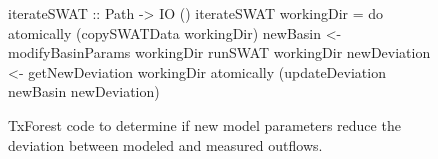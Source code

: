 \begin{figure}
\begin{code}
iterateSWAT :: Path -> IO ()
iterateSWAT workingDir = do
  atomically (copySWATData workingDir)
  newBasin <- modifyBasinParams workingDir
  runSWAT workingDir
  newDeviation <- getNewDeviation workingDir
  atomically (updateDeviation newBasin newDeviation)
\end{code}
\caption{TxForest code to determine if new model parameters reduce the
deviation between modeled and measured outflows.}
\label{fig:SWAT-opt-code}
\end{figure}



